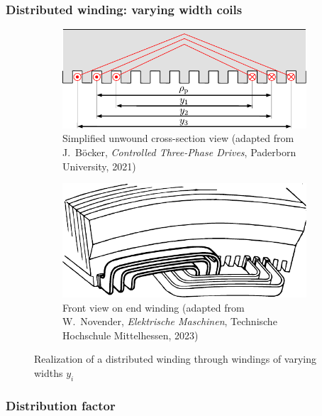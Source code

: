 \begin{frame}
	\frametitle{Distributed winding: varying width coils}
    \begin{figure}
		\centering
		\begin{subfigure}[b]{0.49\textwidth}
			\centering
			\includegraphics[height=0.35\textheight]{fig/lec05/Distributed_winding_different_width_01.pdf}
			\caption{Simplified unwound cross-section view (adapted from J.~B\"ocker, \textit{Controlled Three-Phase Drives}, Paderborn University, 2021)}
		\end{subfigure}
		\hfill
		\begin{subfigure}[b]{0.49\textwidth}
			\centering
			\includegraphics[height=0.35\textheight]{fig/lec05/Distributed_winding_different_width_02.pdf}
			\caption{Front view on end winding  (adapted from W.~Novender, \textit{Elektrische Maschinen}, Technische Hochschule Mittelhessen, 2023)}
		\end{subfigure}
		\caption{Realization of a distributed winding through windings of varying widths $y_i$} 
        \label{fig:Distributed_winding_different_width}
	\end{figure}
\end{frame}

\begin{frame}
	\frametitle{Distribution factor}
    
\end{frame}